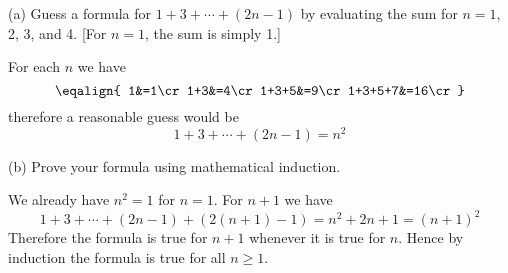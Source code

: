 
\medskip
(a) Guess a formula for $1+3+\cdots+(2n-1)$ by evaluating the sum for
$n=1$, 2, 3, and 4. [For $n=1$, the sum is simply 1.]

\medskip
For each $n$ we have
$$\eqalign{
1&=1\cr
1+3&=4\cr
1+3+5&=9\cr
1+3+5+7&=16\cr
}$$
therefore a reasonable guess would be
$$1+3+\cdots+(2n-1)=n^2$$

\medskip
(b) Prove your formula using mathematical induction.

\medskip
We already have $n^2=1$ for $n=1$.
For $n+1$ we have
$$1+3+\cdots+(2n-1)+(2(n+1)-1)=n^2+2n+1=(n+1)^2$$
Therefore the formula is true for $n+1$ whenever it is true for $n$.
Hence by induction the formula is true for all $n\ge1$.

